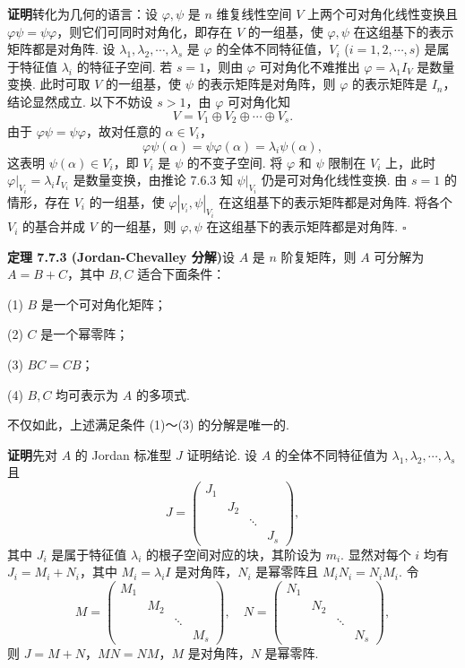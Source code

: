 \documentclass[UTF8,12pt,a4paper,fontset=fandol]{ctexart}
\begin{document}
\noindent\textbf{证明}\quad 转化为几何的语言：设 $\varphi,\psi$ 是 $n$ 维复线性空间 $V$ 上两个可对角化线性变换且 $\varphi\psi=\psi\varphi$，则它们可同时对角化，即存在 $V$ 的一组基，使 $\varphi,\psi$ 在这组基下的表示矩阵都是对角阵. 设 $\lambda_1,\lambda_2,\cdots,\lambda_s$ 是 $\varphi$ 的全体不同特征值，$V_i$ ($i=1,2,\cdots,s$) 是属于特征值 $\lambda_i$ 的特征子空间. 若 $s=1$，则由 $\varphi$ 可对角化不难推出 $\varphi=\lambda_1I_V$ 是数量变换. 此时可取 $V$ 的一组基，使 $\psi$ 的表示矩阵是对角阵，则 $\varphi$ 的表示矩阵是 $I_n$，结论显然成立. 以下不妨设 $s>1$，由 $\varphi$ 可对角化知
\[
V=V_1\oplus V_2\oplus\cdots\oplus V_s.
\]
由于 $\varphi\psi=\psi\varphi$，故对任意的 $\alpha\in V_i$，
\[
\varphi\psi(\alpha)=\psi\varphi(\alpha)=\lambda_i\psi(\alpha),
\]
这表明 $\psi(\alpha)\in V_i$，即 $V_i$ 是 $\psi$ 的不变子空间. 将 $\varphi$ 和 $\psi$ 限制在 $V_i$ 上，此时 $\varphi|_{V_i}=\lambda_iI_{V_i}$ 是数量变换，由推论 7.6.3 知 $\psi|_{V_i}$ 仍是可对角化线性变换. 由 $s=1$ 的情形，存在 $V_i$ 的一组基，使 $\varphi|_{V_i},\psi|_{V_i}$ 在这组基下的表示矩阵都是对角阵. 将各个 $V_i$ 的基合并成 $V$ 的一组基，则 $\varphi,\psi$ 在这组基下的表示矩阵都是对角阵. $\square$

\noindent\textbf{定理 7.7.3 (Jordan-Chevalley 分解)}\quad 设 $A$ 是 $n$ 阶复矩阵，则 $A$ 可分解为 $A=B+C$，其中 $B,C$ 适合下面条件：

(1) $B$ 是一个可对角化矩阵；

(2) $C$ 是一个幂零阵；

(3) $BC=CB$；

(4) $B,C$ 均可表示为 $A$ 的多项式.

不仅如此，上述满足条件 (1)～(3) 的分解是唯一的.

\noindent\textbf{证明}\quad 先对 $A$ 的 Jordan 标准型 $J$ 证明结论. 设 $A$ 的全体不同特征值为 $\lambda_1,\lambda_2,\cdots,\lambda_s$ 且
\[
J=\left(\begin{array}{cccc}
J_1 & & & \\
& J_2 & & \\
& & \ddots & \\
& & & J_s
\end{array}\right),
\]
其中 $J_i$ 是属于特征值 $\lambda_i$ 的根子空间对应的块，其阶设为 $m_i$. 显然对每个 $i$ 均有 $J_i=M_i+N_i$，其中 $M_i=\lambda_iI$ 是对角阵，$N_i$ 是幂零阵且 $M_iN_i=N_iM_i$. 令
\[
M=\left(\begin{array}{cccc}
M_1 & & & \\
& M_2 & & \\
& & \ddots & \\
& & & M_s
\end{array}\right),\quad
N=\left(\begin{array}{cccc}
N_1 & & & \\
& N_2 & & \\
& & \ddots & \\
& & & N_s
\end{array}\right),
\]
则 $J=M+N$，$MN=NM$，$M$ 是对角阵，$N$ 是幂零阵.
\end{document}
